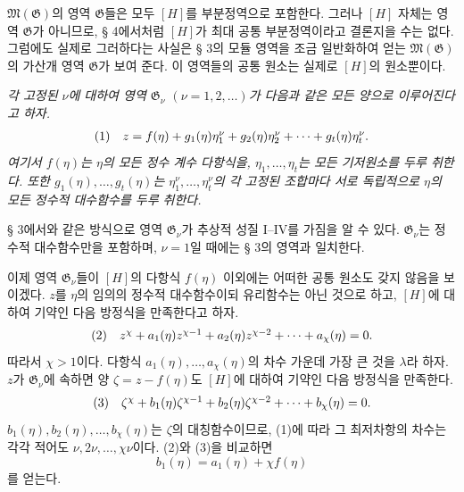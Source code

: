 $\mathfrak M(\mathfrak G)$의 영역 $\mathfrak G$들은 모두 $[H]$를 부분정역으로 포함한다. 그러나 $[H]$ 자체는 영역 $\mathfrak G$가 아니므로, § 4에서처럼 $[H]$가 최대 공통 부분정역이라고 결론지을 수는 없다. 그럼에도 실제로 그러하다는 사실은 § 3의 모듈 영역을 조금 일반화하여 얻는 $\mathfrak M(\mathfrak G)$의 가산개 영역 $\mathfrak G$가 보여 준다. 이 영역들의 공통 원소는 실제로 $[H]$의 원소뿐이다.

\emph{각 고정된 $\nu$에 대하여 영역 $\mathfrak G_\nu$ $(\nu=1,2,\ldots)$가 다음과 같은 모든 양으로 이루어진다고 하자.}
\[
\begin{array}{@{}l@{\quad}c@{}}
(1)& z=f(\eta)+g_1(\eta)\eta_1^\nu+g_2(\eta)\eta_2^\nu+\cdots+g_t(\eta)\eta_t^\nu.
\end{array}
\]
\emph{여기서 $f(\eta)$는 $\eta$의 모든 정수 계수 다항식을, $\eta_1,\ldots,\eta_t$는 모든 기저원소를 두루 취한다. 또한 $g_1(\eta),\ldots,g_t(\eta)$는 $\eta_1^\nu,\ldots,\eta_t^\nu$의 각 고정된 조합마다 서로 독립적으로 $\eta$의 모든 정수적 대수함수를 두루 취한다.}

§ 3에서와 같은 방식으로 영역 $\mathfrak G_\nu$가 추상적 성질 I--IV를 가짐을 알 수 있다. $\mathfrak G_\nu$는 정수적 대수함수만을 포함하며, $\nu=1$일 때에는 § 3의 영역과 일치한다.

이제 영역 $\mathfrak G_\nu$들이 $[H]$의 다항식 $f(\eta)$ 이외에는 어떠한 공통 원소도 갖지 않음을 보이겠다. $z$를 $\eta$의 임의의 정수적 대수함수이되 유리함수는 아닌 것으로 하고, $[H]$에 대하여 기약인 다음 방정식을 만족한다고 하자.
\[
\begin{array}{@{}l@{\quad}c@{}}
(2)& z^\chi+a_1(\eta)z^{\chi-1}+a_2(\eta)z^{\chi-2}+\cdots+a_\chi(\eta)=0.
\end{array}
\]
따라서 $\chi>1$이다. 다항식 $a_1(\eta),\ldots,a_\chi(\eta)$의 차수 가운데 가장 큰 것을 $\lambda$라 하자. $z$가 $\mathfrak G_\nu$에 속하면 양 $\zeta=z-f(\eta)$도 $[H]$에 대하여 기약인 다음 방정식을 만족한다.
\[
\begin{array}{@{}l@{\quad}c@{}}
(3)& \zeta^\chi+b_1(\eta)\zeta^{\chi-1}+b_2(\eta)\zeta^{\chi-2}+\cdots+b_\chi(\eta)=0.
\end{array}
\]
$b_1(\eta),b_2(\eta),\ldots,b_\chi(\eta)$는 $\zeta$의 대칭함수이므로, (1)에 따라 그 최저차항의 차수는 각각 적어도 $\nu,2\nu,\ldots,\chi\nu$이다. (2)와 (3)을 비교하면
\[
 b_1(\eta)=a_1(\eta)+\chi f(\eta)
\]
를 얻는다.

